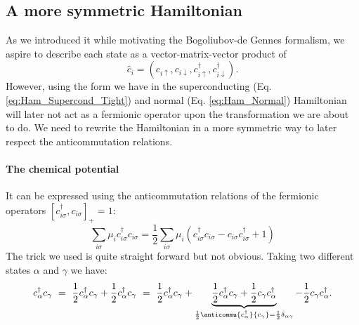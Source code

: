 \documentclass[../main.tex]{subfile}
\begin{document}
\subsection{A more symmetric Hamiltonian}
As we introduced it while motivating the Bogoliubov-de Gennes formalism, we aspire to describe each state as a vector-matrix-vector product of
\[
    \hat{c}_i = \left(c_{i\uparrow}, c_{i\downarrow},c_{i\uparrow}^{\dagger}, c_{i\downarrow}^{\dagger}\right).
\]
However, using the form we have in the superconducting (Eq. \ref{eq:Ham_Supercond_Tight}) and normal (Eq. \ref{eq:Ham_Normal}) 
Hamiltonian will later not act as a fermionic operator upon the transformation we are about to
do. We need to rewrite the Hamiltonian in a more symmetric way to later respect the anticommutation relations.\\

\paragraph{The chemical potential} $~$\\

It can be expressed using the anticommutation relations of the fermionic operators $[c_{i\sigma}^{\dagger},c_{i\sigma}]_+ = 1$:
\begin{equation}\label{eq:SymHam_muTerm}
    \sum_{i\sigma} \mu_i c_{i\sigma}^{\dagger} c_{i\sigma} = \frac{1}{2}\sum_{i\sigma} \mu_i \left(c_{i\sigma}^{\dagger}c_{i\sigma} - c_{i\sigma}c_{i\sigma}^{\dagger} + 1\right)
\end{equation}
The trick we used is quite straight forward but not obvious. Taking two different states $\alpha$ and $\gamma$ we have:
\begin{equation}\label{eq:Trick1}
    c^{\dagger}_{\alpha}c_{\gamma} ~=~ \frac{1}{2}c^{\dagger}_{\alpha}c_{\gamma} + \frac{1}{2}c^{\dagger}_{\alpha}c_{\gamma} ~=~ \frac{1}{2}c^{\dagger}_{\alpha}c_{\gamma} + \underbrace{\frac{1}{2}c^{\dagger}_{\alpha}c_{\gamma} + \frac{1}{2}c_{\gamma}c^{\dagger}_{\alpha}}_{\frac{1}{2}\anticommu{c^{\dagger}_{\alpha}}{c_{\gamma}} = \frac{1}{2}\delta_{\alpha\gamma}} - \frac{1}{2}c_{\gamma}c^{\dagger}_{\alpha}. 
\end{equation}
\end{document}
